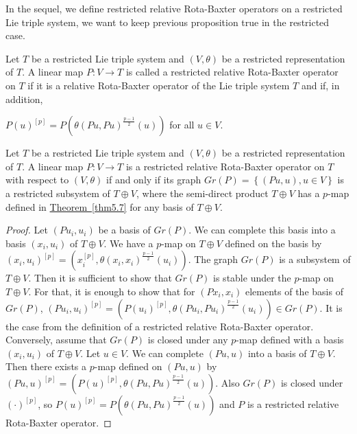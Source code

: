 \documentclass[11pt, twoside]{article}
\begin{document}
In the sequel, we define restricted relative Rota-Baxter operators on a restricted Lie triple system, we want to keep previous proposition true in the restricted case.

\begin{defi}
    Let $T$ be a restricted Lie triple system and $(V,\theta) $ be a restricted representation of $T$. A linear map $P:V\to T $ is called a restricted relative Rota-Baxter operator on $T$ if it is a relative Rota-Baxter operator of the Lie triple system $T$ and if, in addition, \begin{center}
        $P (u)^{[p]}=P(\theta(P u,P u)^{\frac{p-1}{2}}(u)) $ for all $u\in V$.
    \end{center} 
\end{defi}

\begin{prop}
    Let $T$ be a restricted Lie triple system and $(V,\theta)$ be a restricted representation of $T$. A linear map $P:V\to T$ is a restricted relative Rota-Baxter operator on $T$ with respect to $(V,\theta) $ if and only if its graph $Gr(P)= \left\{ (P u,u), u\in V\right\} $ is a restricted subsystem of $T\oplus V $, where the semi-direct product $T\oplus V $ has a $p$-map defined in  \hyperref[thm5.7]{Theorem~\ref*{thm5.7}} for any basis of $T\oplus V $.
\end{prop}

\begin{proof}
    Let $(Pu_i,u_i) $ be a basis of $Gr(P)$. We can complete this basis into a basis $(x_i,u_i) $ of $T\oplus V $. We have a $p$-map on $T\oplus V$ defined on the basis by $(x_i,u_i)^{[p]}=(x_i^{[p]},\theta(x_i,x_i)^{\frac{p-1}{2}}(u_i)) $. The graph  $Gr(P) $ is a subsystem of $T\oplus V$. Then it is sufficient  to show that $Gr(P)$ is stable under the $p$-map on $T\oplus V$. For that, it is enough to show that for $(Px_i,x_i) $ elements of the basis of $Gr(P)$, $(Pu_i,u_i)^{[p]}=(P(u_i)^{[p]}, \theta(Pu_i,Pu_i)^{\frac{p-1}{2}}(u_i))  \in Gr(P) $. It is the case from the definition of a restricted relative Rota-Baxter operator. Conversely, assume that $Gr(P) $ is closed under any $p$-map defined with a basis $(x_i,u_i) $ of $T\oplus V $. Let $u\in V$. We can complete $(Pu,u) $ into a basis of $T\oplus V $. Then there exists a $p$-map defined on $(Pu,u) $ by $(Pu,u)^{[p]}=(P(u)^{[p]}, \theta(Pu,Pu)^{\frac{p-1}{2}}(u))  $. Also $Gr(P)$ is closed under $(\cdot)^{[p]} $, so $P(u)^{[p]}=P(\theta(Pu,Pu)^{\frac{p-1}{2}}(u)) $ and $P$ is a restricted relative Rota-Baxter operator.
\end{proof}
\end{document}
